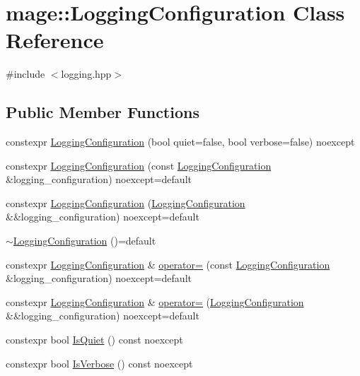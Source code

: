 \hypertarget{classmage_1_1_logging_configuration}{}\section{mage\+:\+:Logging\+Configuration Class Reference}
\label{classmage_1_1_logging_configuration}


{\ttfamily \#include $<$logging.\+hpp$>$}

\subsection*{Public Member Functions}
\begin{DoxyCompactItemize}
\item 
constexpr \hyperlink{classmage_1_1_logging_configuration_a506696943c69d6a56ceef5802e0546ba}{Logging\+Configuration} (bool quiet=false, bool verbose=false) noexcept
\item 
constexpr \hyperlink{classmage_1_1_logging_configuration_afe974380c272591d7f140c6dc4498a48}{Logging\+Configuration} (const \hyperlink{classmage_1_1_logging_configuration}{Logging\+Configuration} \&logging\+\_\+configuration) noexcept=default
\item 
constexpr \hyperlink{classmage_1_1_logging_configuration_a447ba40938b958f3677e8f096970ae8e}{Logging\+Configuration} (\hyperlink{classmage_1_1_logging_configuration}{Logging\+Configuration} \&\&logging\+\_\+configuration) noexcept=default
\item 
\hyperlink{classmage_1_1_logging_configuration_a842cd1d5cf22c9fb6e2c76e684cd08ee}{$\sim$\+Logging\+Configuration} ()=default
\item 
constexpr \hyperlink{classmage_1_1_logging_configuration}{Logging\+Configuration} \& \hyperlink{classmage_1_1_logging_configuration_a159b4a7b20a34f1b08f4344a77689b13}{operator=} (const \hyperlink{classmage_1_1_logging_configuration}{Logging\+Configuration} \&logging\+\_\+configuration) noexcept=default
\item 
constexpr \hyperlink{classmage_1_1_logging_configuration}{Logging\+Configuration} \& \hyperlink{classmage_1_1_logging_configuration_adf70888b290b3b160c37c350e891900e}{operator=} (\hyperlink{classmage_1_1_logging_configuration}{Logging\+Configuration} \&\&logging\+\_\+configuration) noexcept=default
\item 
constexpr bool \hyperlink{classmage_1_1_logging_configuration_a1096a1ef5f9237fb76fc5937ac1a1210}{Is\+Quiet} () const noexcept
\item 
constexpr bool \hyperlink{classmage_1_1_logging_configuration_abd81834c6938be1b32a7bd6eb08d5242}{Is\+Verbose} () const noexcept
\end{DoxyCompactItemize}
